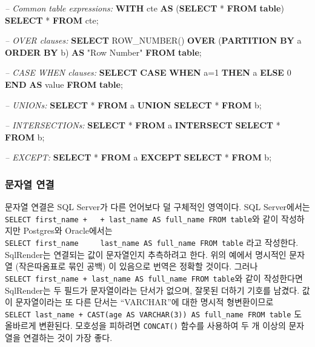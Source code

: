 \documentclass[11pt]{book}
\newenvironment{Shaded}{\begin{snugshade}}{\end{snugshade}}
\newcommand{\KeywordTok}[1]{\textcolor[rgb]{0.13,0.29,0.53}{\textbf{#1}}}
\newcommand{\DecValTok}[1]{\textcolor[rgb]{0.00,0.00,0.81}{#1}}
\newcommand{\CommentTok}[1]{\textcolor[rgb]{0.56,0.35,0.01}{\textit{#1}}}
\newcommand{\OtherTok}[1]{\textcolor[rgb]{0.56,0.35,0.01}{#1}}
\newcommand{\FunctionTok}[1]{\textcolor[rgb]{0.00,0.00,0.00}{#1}}
\newcommand{\NormalTok}[1]{#1}
\theoremstyle{definition}
\theoremstyle{definition}
\theoremstyle{definition}
\theoremstyle{remark}
\begin{document}
\begin{Shaded}
\begin{Highlighting}[]
\CommentTok{-- Common table expressions:}
\KeywordTok{WITH}\NormalTok{ cte }\KeywordTok{AS}\NormalTok{ (}\KeywordTok{SELECT}\NormalTok{ * }\KeywordTok{FROM} \KeywordTok{table}\NormalTok{) }\KeywordTok{SELECT}\NormalTok{ * }\KeywordTok{FROM}\NormalTok{ cte;}

\CommentTok{-- OVER clauses:}
\KeywordTok{SELECT} \FunctionTok{ROW_NUMBER}\NormalTok{() }\KeywordTok{OVER}\NormalTok{ (}\KeywordTok{PARTITION} \KeywordTok{BY}\NormalTok{ a }\KeywordTok{ORDER} \KeywordTok{BY}\NormalTok{ b)}
  \KeywordTok{AS} \OtherTok{"Row Number"} \KeywordTok{FROM} \KeywordTok{table}\NormalTok{;}
  
\CommentTok{-- CASE WHEN clauses:}
\KeywordTok{SELECT} \KeywordTok{CASE} \KeywordTok{WHEN}\NormalTok{ a=}\DecValTok{1} \KeywordTok{THEN}\NormalTok{ a }\KeywordTok{ELSE} \DecValTok{0} \KeywordTok{END} \KeywordTok{AS} \FunctionTok{value} \KeywordTok{FROM} \KeywordTok{table}\NormalTok{;}

\CommentTok{-- UNIONs:}
\KeywordTok{SELECT}\NormalTok{ * }\KeywordTok{FROM}\NormalTok{ a }\KeywordTok{UNION} \KeywordTok{SELECT}\NormalTok{ * }\KeywordTok{FROM}\NormalTok{ b;}

\CommentTok{-- INTERSECTIONs:}
\KeywordTok{SELECT}\NormalTok{ * }\KeywordTok{FROM}\NormalTok{ a }\KeywordTok{INTERSECT} \KeywordTok{SELECT}\NormalTok{ * }\KeywordTok{FROM}\NormalTok{ b;}

\CommentTok{-- EXCEPT:}
\KeywordTok{SELECT}\NormalTok{ * }\KeywordTok{FROM}\NormalTok{ a }\KeywordTok{EXCEPT} \KeywordTok{SELECT}\NormalTok{ * }\KeywordTok{FROM}\NormalTok{ b;}
\end{Highlighting}
\end{Shaded}

\subsubsection*{문자열 연결}\label{-}

문자열 연결은 SQL Server가 다른 언어보다 덜 구체적인 영역이다. SQL
Server에서는
\texttt{SELECT\ first\_name\ +\ \textquotesingle{}\ \textquotesingle{}\ +\ last\_name\ AS\ full\_name\ FROM\ table}와
같이 작성하지만 Postgres와 Oracle에서는
\texttt{SELECT\ first\_name\ \textbar{}\textbar{}\ \textquotesingle{}\ \textquotesingle{}\ \textbar{}\textbar{}\ last\_name\ AS\ full\_name\ FROM\ table}
라고 작성한다. SqlRender는 연결되는 값이 문자열인지 추측하려고 한다.
위의 예에서 명시적인 문자열 (작은따옴표로 묶인 공백) 이 있음으로 번역은
정확할 것이다. 그러나
\texttt{SELECT\ first\_name\ +\ last\_name\ AS\ full\_name\ FROM\ table}와
같이 작성한다면 SqlRender는 두 필드가 문자열이라는 단서가 없으며, 잘못된
더하기 기호를 남겼다. 값이 문자열이라는 또 다른 단서는 ``VARCHAR''에
대한 명시적 형변환이므로
\texttt{SELECT\ last\_name\ +\ CAST(age\ AS\ VARCHAR(3))\ AS\ full\_name\ FROM\ table}
도 올바르게 변환된다. 모호성을 피하려면 \texttt{CONCAT()} 함수를
사용하여 두 개 이상의 문자열을 연결하는 것이 가장 좋다.
\end{document}
